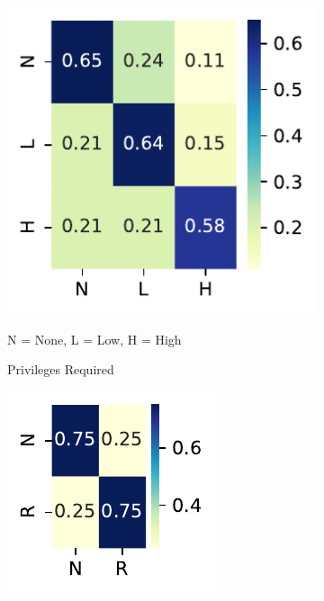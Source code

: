 \documentclass[12pt]{article}
\begin{document}
\begin{figure}
	\begin{subfigure}[b]{0.45\textwidth}
		\includegraphics[width=\textwidth]{./figures/confusion_matrices/privileges_required_mitre.pdf}
		\caption{Privileges Required}
		\begin{tablenotes}
			\footnotesize
			\item \quad N = None, L = Low, H = High
		\end{tablenotes}
	\end{subfigure}
	\hfill
	\begin{subfigure}[b]{0.45\textwidth}
		\includegraphics[width=\textwidth]{./figures/confusion_matrices/user_interaction_mitre.pdf}

\end{subfigure}
\end{figure}
\end{document}
